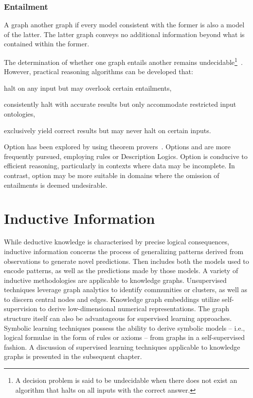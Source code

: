 \subsubsection{Entailment}
A graph  another graph if every model consistent with the former is also a model of the latter. The latter graph conveys no additional information beyond what is contained within the former.

The determination of whether one graph entails another remains undecidable\footnote{A decision problem is said to be undecidable when there does not exist an algorithm that halts on all inputs with the correct answer.}~\cite{Hitzler2010FoundationsSWTechnologies}. However, practical reasoning algorithms can be developed that:
\begin{enumerate*}[label=(\roman*),before=\unskip{ i.e., }, itemjoin={{, }}, itemjoin*={{, or }}]
    \item\label{opt_1} halt on any input but may overlook certain entailments,
    \item\label{opt_2} consistently halt with accurate results but only accommodate restricted input ontologies,
    \item\label{opt_3} exclusively yield correct results but may never halt on certain inputs.
\end{enumerate*}

Option  has been explored by using theorem provers~\cite{Schneider2011ReasoningOWL2Full}. Options  and  are more frequently pursued, employing rules or Description Logics. Option  is conducive to efficient reasoning, particularly in contexts where data may be incomplete. In contrast, option  may be more suitable in domains where the omission of entailments is deemed undesirable.

\section{Inductive Information}\label{inductive-information}
While deductive knowledge is characterised by precise logical consequences, inductive information concerns the process of generalizing patterns derived from observations to generate novel predictions. Then  includes both the models used to encode patterns, as well as the predictions made by those models.
A variety of inductive methodologies are applicable to knowledge graphs. Unsupervised techniques leverage graph analytics to identify communities or clusters, as well as to discern central nodes and edges. Knowledge graph embeddings utilize self-supervision to derive low-dimensional numerical representations. The graph structure itself can also be advantageous for supervised learning approaches. Symbolic learning techniques possess the ability to derive symbolic models – i.e., logical formulae in the form of rules or axioms – from graphs in a self-supervised fashion. A discussion of supervised learning techniques applicable to knowledge graphs is presented in the subsequent chapter.

